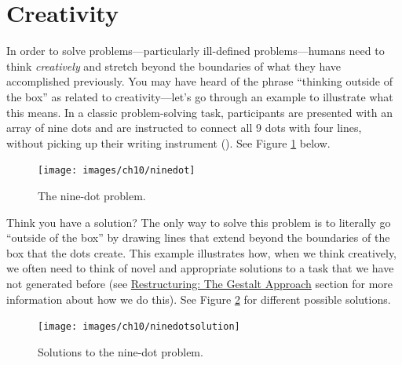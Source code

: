 \documentclass[
]{krantz}
\begin{document}
\section{Creativity}\label{creativity}

In order to solve problems---particularly ill-defined problems---humans need to think \emph{creatively} and stretch beyond the boundaries of what they have accomplished previously. You may have heard of the phrase ``thinking outside of the box'' as related to creativity---let's go through an example to illustrate what this means. In a classic problem-solving task, participants are presented with an array of nine dots and are instructed to connect all 9 dots with four lines, without picking up their writing instrument (). See Figure \ref{fig:ninedot} below.

\begin{figure}

{\centering \texttt{[image: images/ch10/ninedot]} 

}

\caption{The nine-dot problem.}\label{fig:ninedot}
\end{figure}

Think you have a solution? The only way to solve this problem is to literally go ``outside of the box'' by drawing lines that extend beyond the boundaries of the box that the dots create. This example illustrates how, when we think creatively, we often need to think of novel and appropriate solutions to a task that we have not generated before (see \hyperref[restructuring-the-gestalt-approach]{Restructuring: The Gestalt Approach} section for more information about how we do this). See Figure \ref{fig:ninedotsolution} for different possible solutions.

\begin{figure}

{\centering \texttt{[image: images/ch10/ninedotsolution]} 

}

\caption{Solutions to the nine-dot problem.}\label{fig:ninedotsolution}
\end{figure}
\end{document}
